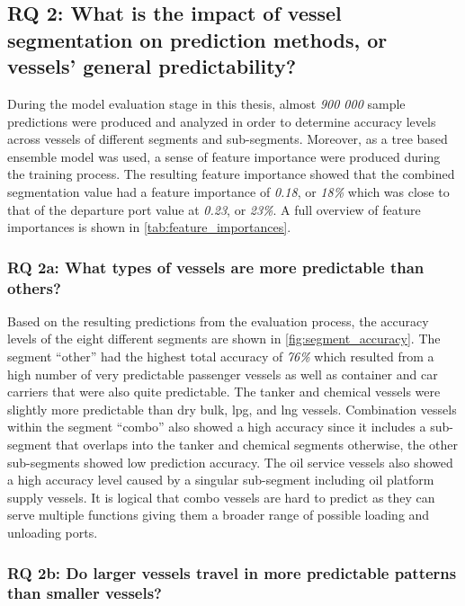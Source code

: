 \subsection{RQ 2: What is the impact of vessel segmentation on prediction methods, or vessels' general predictability?}

During the model evaluation stage in this thesis, almost \textit{900 000} sample predictions were produced and analyzed in order to determine accuracy levels across vessels of different segments and sub-segments. Moreover, as a tree based ensemble model was used, a sense of feature importance were produced during the training process. The resulting feature importance showed that the combined segmentation value had a feature importance of \textit{0.18}, or \textit{18\%} which was close to that of the departure port value at \textit{0.23}, or \textit{23\%}. A full overview of feature importances is shown in \cref{tab:feature_importances}.

\subsubsection{RQ 2a: What types of vessels are more predictable than others?}

Based on the resulting predictions from the evaluation process, the accuracy levels of the eight different segments are shown in \cref{fig:segment_accuracy}. The segment ``other'' had the highest total accuracy of \textit{76\%} which resulted from a high number of very predictable passenger vessels as well as container and car carriers that were also quite predictable. The tanker and chemical vessels were slightly more predictable than dry bulk, \acrfull{lpg}, and \acrfull{lng} vessels. Combination vessels within the segment ``combo'' also showed a high accuracy since it includes a sub-segment that overlaps into the tanker and chemical segments otherwise, the other sub-segments showed low prediction accuracy. The oil service vessels also showed a high accuracy level caused by a singular sub-segment including oil platform supply vessels. It is logical that combo vessels are hard to predict as they can serve multiple functions giving them a broader range of possible loading and unloading ports.

\subsubsection{RQ 2b: Do larger vessels travel in more predictable patterns than smaller vessels?}

